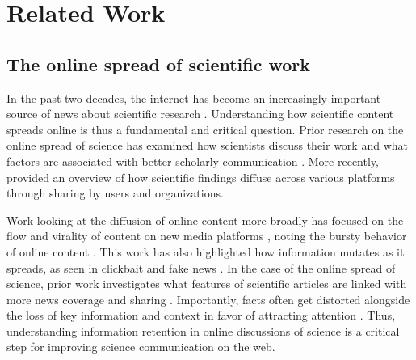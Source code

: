 \documentclass[letterpaper]{article} %
\begin{document}
\section{Related Work}
\subsection{The online spread of scientific work}
In the past two decades, the internet has become an increasingly important source of news about scientific research \citep{brossardNewMediaLandscapes2013,vaneperenHowScientistsUse2011,hargittaiHowYoungAdults2018,nationalscienceboardScienceTechnologyPublic2020}. %
Understanding how scientific content spreads online is thus a fundamental and critical question. Prior research on the online spread of science has examined how scientists discuss their work \cite{robinson-garciaUnbearableEmptinessTweeting2017,reinhardtHowPeopleAre2009} and what factors are associated with better scholarly communication \citep{milkmanScienceSharingSharing2014}. More recently, \citet{zakhlebinDiffusionScientificArticles2020} provided an overview of how scientific findings diffuse across various platforms through sharing by users and organizations.

Work looking at the diffusion of online content more broadly has focused on the flow and virality of content on new media platforms \cite{adarTrackingInformationEpidemics2005,adamicInformationEvolutionSocial2016,lakkarajuWhatNameUnderstanding2013,lermanInformationContagionEmpirical2010, romeroDifferencesMechanicsInformation2011,bakshyRoleSocialNetworks2012}, noting the bursty %
behavior of online content \citep{chengCanCascadesBe2014,chengCascadesRecur2016}. This work has also highlighted how information mutates as it spreads, as seen in clickbait and fake news \cite{chenMisleadingOnlineContent2015,vosoughiSpreadTrueFalse2018,lazerScienceFakeNews2018,guptaFakingSandyCharacterizing2013}.
In the case of the online spread of science, prior work investigates what features of scientific articles are linked with more news coverage and sharing \citep{milkmanScienceSharingSharing2014,maclaughlinPredictingNewsCoverage2018}. Importantly, facts often get distorted alongside the loss of key information and context in favor of attracting attention \citep[see for example][]{burnettHowMediaWarp2017}. Thus, understanding information retention in online discussions of science is a critical step for improving science communication on the web.
\end{document}

